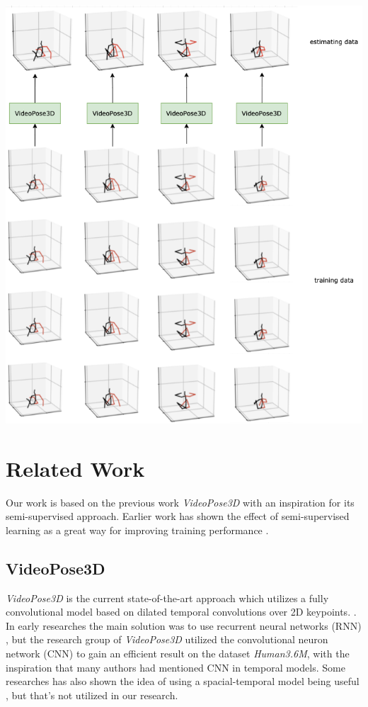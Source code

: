 \documentclass[10pt,twocolumn,letterpaper]{article}
\begin{document}
\includegraphics[scale=0.35]{model_new}

\section{Related Work}

Our work is based on the previous work \textit{VideoPose3D} with an inspiration for its
semi-supervised approach. Earlier work has shown the effect of semi-supervised learning
as a great way for improving training performance \cite{zhu2009introduction}. 

\subsection{VideoPose3D}


\textit{VideoPose3D} is the current state-of-the-art approach which utilizes a fully 
convolutional model based on dilated temporal convolutions over 2D keypoints. 
\cite{pavlakos2017coarse,pavllo20193d}. In early researches the main solution
was to use recurrent neural networks (RNN) \cite{lee2018propagating}, but the research
group of \textit{VideoPose3D} utilized the convolutional neuron network (CNN) to gain
an efficient result on the dataset \textit{Human3.6M}, with the inspiration that
many authors had mentioned CNN in temporal models. Some researches has also shown the 
idea of using a spacial-temporal model being useful \cite{7298734}, but that's not utilized in our 
research.
\end{document}
